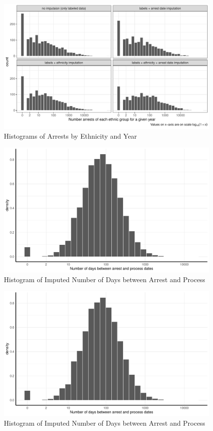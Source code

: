 \begin{figure}[!h]
\centering
\includegraphics[width=1.2\textwidth]{plots/arrests/facet_hist.pdf}
\caption{Histograms of Arrests by Ethnicity and Year}
\label{fig:facet_by_year}
\end{figure}
\begin{figure}[!h]
\centering
\includegraphics[width=1.2\textwidth]{plots/imputing_arrest_date/mixed_model_preds_hist.pdf}
\caption{Histogram of Imputed Number of Days between Arrest and Process}
\label{fig:mixed_model_preds_hist}
\end{figure}
\begin{figure}[!h]
\centering
\includegraphics[width=1.2\textwidth]{plots/imputing_arrest_date/mixed_model_preds_hist.pdf}
\caption{Histogram of Imputed Number of Days between Arrest and Process}
\label{fig:mixed_model_preds_hist}
\end{figure}

%
